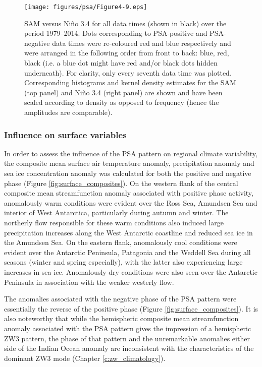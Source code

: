 \begin{figure}
\begin{center}
\texttt{[image: figures/psa/Figure4-9.eps]}
\caption[SAM versus Ni\~{n}o 3.4 for various temporal subsets]{\label{fig:sam_v_enso}
SAM versus Ni\~{n}o 3.4 for all data times (shown in black) over the period 1979--2014. Dots corresponding to PSA-positive and PSA-negative data times were re-coloured red and blue respectively and were arranged in the following order from front to back: blue, red, black (i.e. a blue dot might have red and/or black dots hidden underneath). For clarity, only every seventh data time was plotted. Corresponding histograms and kernel density estimates for the SAM (top panel) and Ni\~{n}o 3.4 (right panel) are shown and have been scaled according to density as opposed to frequency (hence the amplitudes are comparable).%
}
\end{center}
\end{figure}

\subsubsection{Influence on surface variables} 

In order to assess the influence of the PSA pattern on regional climate variability, the composite mean surface air temperature anomaly, precipitation anomaly and sea ice concentration anomaly was calculated for both the positive and negative phase (Figure \ref{fig:surface_composites}). On the western flank of the central composite mean streamfunction anomaly associated with positive phase activity, anomalously warm conditions were evident over the Ross Sea, Amundsen Sea and interior of West Antarctica, particularly during autumn and winter. The northerly flow responsible for these warm conditions also induced large precipitation increases along the West Antarctic coastline and reduced sea ice in the Amundsen Sea. On the eastern flank, anomalously cool conditions were evident over the Antarctic Peninsula, Patagonia and the Weddell Sea during all seasons (winter and spring especially), with the latter also experiencing large increases in sea ice. Anomalously dry conditions were also seen over the Antarctic Peninsula in association with the weaker westerly flow. 

The anomalies associated with the negative phase of the PSA pattern were essentially the reverse of the positive phase (Figure \ref{fig:surface_composites}). It is also noteworthy that while the hemispheric composite mean streamfunction anomaly associated with the PSA pattern gives the impression of a hemispheric ZW3 pattern, the phase of that pattern and the unremarkable anomalies either side of the Indian Ocean anomaly are inconsistent with the characteristics of the dominant ZW3 mode (Chapter \ref{c:zw_climatology}).

